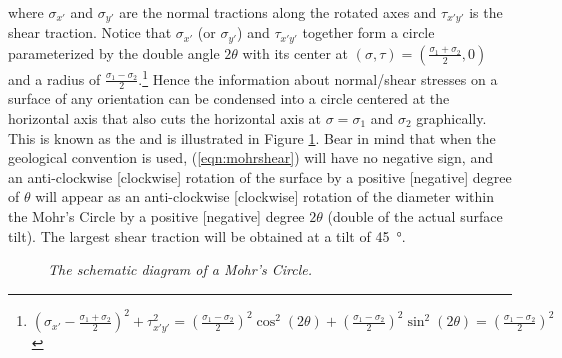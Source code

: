 where $\sigma_{x'}$ and $\sigma_{y'}$ are the normal tractions along the rotated axes and $\tau_{x'y'}$ is the shear traction. Notice that $\sigma_{x'}$ (or $\sigma_{y'}$) and $\tau_{x'y'}$ together form a circle parameterized by the double angle $2\theta$ with its center at $(\sigma, \tau) = (\frac{\sigma_1 + \sigma_2}{2}, 0)$ and a radius of $\frac{\sigma_1 - \sigma_2}{2}$.\footnote{$
(\sigma_{x'} - \frac{\sigma_1 + \sigma_2}{2})^2 + \tau_{x'y'}^2 = (\frac{\sigma_1 - \sigma_2}{2})^2\cos^2(2\theta) + (\frac{\sigma_1 - \sigma_2}{2})^2 \sin^2(2\theta) = (\frac{\sigma_1 - \sigma_2}{2})^2$}
Hence the information about normal/shear stresses on a surface of any orientation can be condensed into a circle centered at the horizontal axis that also cuts the horizontal axis at $\sigma = \sigma_1$ and $\sigma_2$ graphically. This is known as the  and is illustrated in Figure \ref{fig:mohr1}. Bear in mind that when the geological convention is used, (\ref{eqn:mohrshear}) will have no negative sign, and an anti-clockwise [clockwise] rotation of the surface by a positive [negative] degree of $\theta$ will appear as an anti-clockwise [clockwise] rotation of the diameter within the Mohr's Circle by a positive [negative] degree $2\theta$ (double of the actual surface tilt). The largest shear traction will be obtained at a tilt of \SI{45}{\degree}.
 
\begin{figure}[t!]
\centering
    \caption{\textit{The schematic diagram of a Mohr's Circle.}}
    \label{fig:mohr1}
\end{figure}

